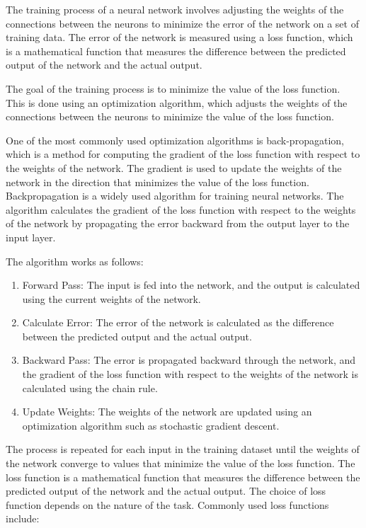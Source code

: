 The training process of a neural network involves adjusting the weights of the connections between the neurons to minimize the error of the network on a set of training data. The error of the network is measured using a loss function, which is a mathematical function that measures the difference between the predicted output of the network and the actual output.

The goal of the training process is to minimize the value of the loss function. This is done using an optimization algorithm, which adjusts the weights of the connections between the neurons to minimize the value of the loss function.

One of the most commonly used optimization algorithms is back-propagation, which is a method for computing the gradient of the loss function with respect to the weights of the network. The gradient is used to update the weights of the network in the direction that minimizes the value of the loss function.
Backpropagation is a widely used algorithm for training neural networks. The algorithm calculates the gradient of the loss function with respect to the weights of the network by propagating the error backward from the output layer to the input layer.

The algorithm works as follows:
\begin{enumerate}
    \item Forward Pass: The input is fed into the network, and the output is calculated using the current weights of the network.
    \item Calculate Error: The error of the network is calculated as the difference between the predicted output and the actual output.
    \item Backward Pass: The error is propagated backward through the network, and the gradient of the loss function with respect to the weights of the network is calculated using the chain rule.
    \item Update Weights: The weights of the network are updated using an optimization algorithm such as stochastic gradient descent.
\end{enumerate}

The process is repeated for each input in the training dataset until the weights of the network converge to values that minimize the value of the loss function. The loss function is a mathematical function that measures the difference between the predicted output of the network and the actual output. The choice of loss function depends on the nature of the task.
Commonly used loss functions include:

